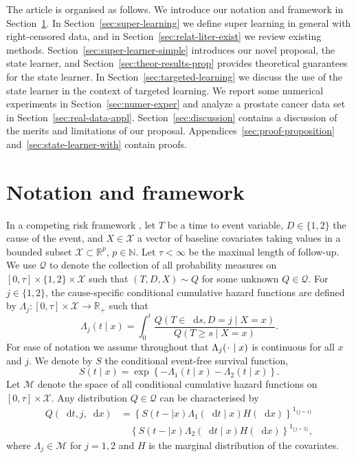 \documentclass{statsoc}
\newcommand{\R}{\mathbb{R}}
\newcommand{\N}{\mathbb{N}}
\newcommand{\blank}{\makebox[1ex]{\textbf{$\cdot$}}}
\newcommand*\diff{\mathop{}\!\mathrm{d}}
\newcommand{\1}{\mathds{1}}
\begin{document}
The article is organised as follows. We introduce our notation and framework in
Section~\ref{sec:framework}. In Section~\ref{sec:super-learning} we define super
learning in general with right-censored data, and in
Section~\ref{sec:relat-liter-exist} we review existing methods.
Section~\ref{sec:super-learner-simple} introduces our novel proposal, the state
learner, and Section~\ref{sec:theor-results-prop} provides theoretical
guarantees for the state learner. In Section~\ref{sec:targeted-learning} we
discuss the use of the state learner in the context of targeted learning. We
report some numerical experiments in Section~\ref{sec:numer-exper} and analyze a
prostate cancer data set in Section~\ref{sec:real-data-appl}.
Section~\ref{sec:discussion} contains a discussion of the merits and limitations
of our proposal. Appendices~\ref{sec:proof-proposition}
and~\ref{sec:state-learner-with} contain proofs.


\section{Notation and framework}
\label{sec:framework}

In a competing risk framework \citep{andersen2012statistical}, let \( T\) be a
time to event variable, \(D\in\{1,2\}\) the cause of the event, and
$X \in \mathcal{X}$ a vector of baseline covariates taking values in a bounded
subset \( \mathcal{X} \subset \R^p \), \( p\in\N \). Let $\tau< \infty$ be the
maximal length of follow-up. We use \( \mathcal{Q} \) to denote the collection
of all probability measures on \( [0,\tau] \times \{1,2\}\times \mathcal{X} \)
such that \( (T, D, X) \sim Q \) for some unknown \( Q \in \mathcal{Q} \). For
\(j\in\{1,2\}\), the cause-specific conditional cumulative hazard functions are
defined by
\( \Lambda_{j} \colon [0, \tau] \times \mathcal{X} \rightarrow \R_+ \) such that
\begin{equation*}
  \Lambda_{j}(t \mid x) = \int_0^t\frac{  Q(T \in \diff s, D=j \mid X=x )}{Q(T \geq s \mid X=x )}.
\end{equation*}
For ease of notation we assume throughout that \( \Lambda_j(\blank \mid x) \) is
continuous for all \( x \) and \( j \). We denote by \(S\) the conditional
event-free survival function,
\begin{equation}
  \label{eq:surv-def}
  S(t \mid x)=\exp\left\{-\Lambda_{1}(t \mid x)-\Lambda_{2}(t \mid x)\right\}.
\end{equation}
Let \( \mathcal{M} \) denote the space of all conditional cumulative hazard
functions on \( [0,\tau] \times\mathcal{X}\). Any distribution
\( Q \in \mathcal{Q} \) can be characterised by
\begin{equation*}
  \label{eq:parametrizeQ}
  \begin{split}
    Q(\diff t,j,\diff x)&= \left\{S(t- \mid x)\Lambda_1(\diff t \mid x)H(\diff x)\right\}^{1_{\{j=1\}}}\\
                        &\quad\left\{S(t- \mid x)\Lambda_2(\diff t \mid x)H(\diff x)\right\}^{1_{\{j=2\}}},
  \end{split}
\end{equation*}
where \(\Lambda_{j} \in \mathcal{M}\) for \(j=1,2\) and \(H\) is the marginal
distribution of the covariates.
\end{document}
